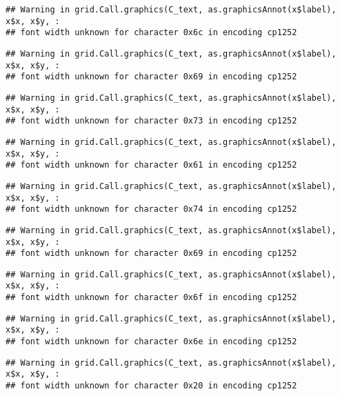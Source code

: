 \documentclass[
]{article}
\begin{document}
\begin{verbatim}
## Warning in grid.Call.graphics(C_text, as.graphicsAnnot(x$label), x$x, x$y, :
## font width unknown for character 0x6c in encoding cp1252
\end{verbatim}

\begin{verbatim}
## Warning in grid.Call.graphics(C_text, as.graphicsAnnot(x$label), x$x, x$y, :
## font width unknown for character 0x69 in encoding cp1252
\end{verbatim}

\begin{verbatim}
## Warning in grid.Call.graphics(C_text, as.graphicsAnnot(x$label), x$x, x$y, :
## font width unknown for character 0x73 in encoding cp1252
\end{verbatim}

\begin{verbatim}
## Warning in grid.Call.graphics(C_text, as.graphicsAnnot(x$label), x$x, x$y, :
## font width unknown for character 0x61 in encoding cp1252
\end{verbatim}

\begin{verbatim}
## Warning in grid.Call.graphics(C_text, as.graphicsAnnot(x$label), x$x, x$y, :
## font width unknown for character 0x74 in encoding cp1252
\end{verbatim}

\begin{verbatim}
## Warning in grid.Call.graphics(C_text, as.graphicsAnnot(x$label), x$x, x$y, :
## font width unknown for character 0x69 in encoding cp1252
\end{verbatim}

\begin{verbatim}
## Warning in grid.Call.graphics(C_text, as.graphicsAnnot(x$label), x$x, x$y, :
## font width unknown for character 0x6f in encoding cp1252
\end{verbatim}

\begin{verbatim}
## Warning in grid.Call.graphics(C_text, as.graphicsAnnot(x$label), x$x, x$y, :
## font width unknown for character 0x6e in encoding cp1252
\end{verbatim}

\begin{verbatim}
## Warning in grid.Call.graphics(C_text, as.graphicsAnnot(x$label), x$x, x$y, :
## font width unknown for character 0x20 in encoding cp1252
\end{verbatim}
\end{document}
